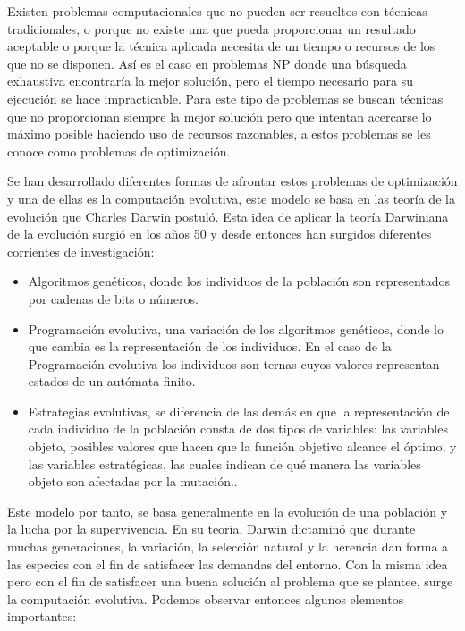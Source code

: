 Existen problemas computacionales que no pueden ser resueltos con técnicas tradicionales, o porque no existe una que pueda proporcionar un resultado aceptable o porque la técnica aplicada necesita de un tiempo o recursos de los que no se disponen. Así es el caso en problemas NP donde una búsqueda exhaustiva encontraría la mejor solución, pero el tiempo necesario para su ejecución se hace impracticable. Para este tipo de problemas se buscan técnicas que no proporcionan siempre la mejor soluci\'on pero que intentan acercarse lo máximo posible haciendo uso de recursos razonables, a estos problemas se les conoce como problemas de optimizaci\'on.

Se han desarrollado diferentes formas de afrontar estos problemas de optimizaci\'on y una de ellas es la computación evolutiva, este modelo se basa en las teoría de la evolución que Charles Darwin postul\'o. Esta idea de aplicar la teor\'ia Darwiniana de la evolución surgió en los a\~nos 50 y desde entonces han surgidos diferentes corrientes de investigación:

\begin{itemize}
	\item Algoritmos genéticos, donde los individuos de la población son representados por cadenas de bits o números.
	\item Programación evolutiva, una variación de los algoritmos genéticos, donde lo que cambia es la representación de los individuos. En el caso de la Programación evolutiva los individuos son ternas cuyos valores representan estados de un autómata finito. 
	\item Estrategias evolutivas, se diferencia de las demás en que la representación de cada individuo de la población consta de dos tipos de variables: las variables objeto, posibles valores que hacen que la función objetivo alcance el óptimo, y las variables estratégicas, las cuales indican de qué manera las variables objeto son afectadas por la mutación.. 
\end{itemize}

Este modelo por tanto, se basa generalmente en la evolución de una población y la lucha por la supervivencia. En su teoría, Darwin dictamin\'o que durante muchas generaciones, la variación, la selección natural y la herencia dan forma a las especies con el fin de satisfacer las demandas del entorno. Con la misma idea pero con el fin de satisfacer una buena solución al problema que se plantee, surge la computación evolutiva. Podemos observar entonces algunos elementos importantes:

